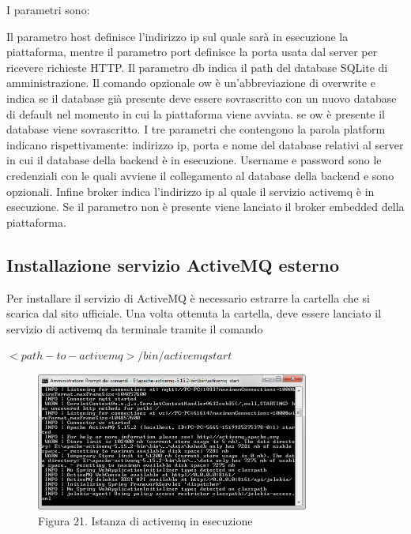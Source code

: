 I parametri sono:
{\selectfont
	
}
Il parametro host definisce l'indirizzo ip sul quale sarà in esecuzione la piattaforma, mentre il parametro port definisce la porta usata dal server per ricevere richieste HTTP.
Il parametro db indica il path del database SQLite di amministrazione. Il comando opzionale ow è un'abbreviazione di overwrite e indica se il database già presente deve essere sovrascritto con un nuovo database di default nel momento in cui la piattaforma viene avviata. se ow è presente il database viene sovrascritto.
I tre parametri che contengono la parola platform indicano rispettivamente: indirizzo ip, porta e nome del database relativi al server in cui il database della backend è in esecuzione.
Username e password sono le credenziali con le quali avviene il collegamento al database della backend e sono opzionali. Infine broker indica l'indirizzo ip al quale il servizio activemq è in esecuzione. Se il parametro non è presente viene lanciato il broker embedded della piattaforma.
\clearpage
\subsection{Installazione servizio ActiveMQ esterno}
Per installare il servizio di ActiveMQ è necessario estrarre la cartella che si scarica dal sito ufficiale. Una volta ottenuta la cartella, deve essere lanciato il servizio di activemq da terminale tramite il comando 

$<path-to-activemq>/bin/activemq start$
\begin{figure}[h]
	\centering
	\includegraphics[width=0.8\textwidth]{activemq-in-esecuzione.png}
	\caption*{Figura 21. Istanza di activemq in esecuzione}
\end{figure}
\clearpage
